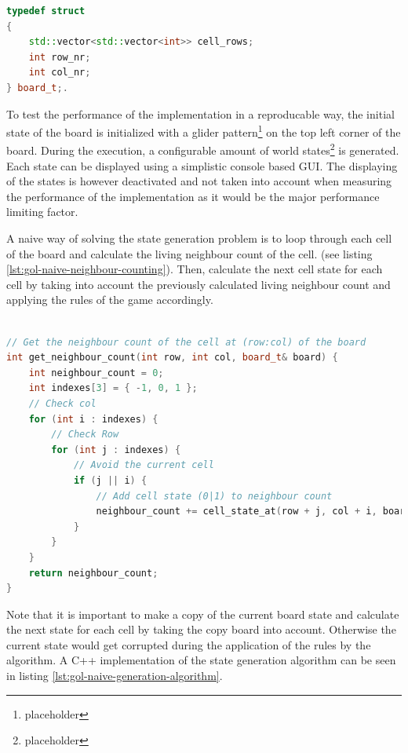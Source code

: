 \documentclass[a4paper,english,12pt,twoside=false]{scrartcl} %
\begin{document}
\begin{lstlisting}[caption={Game of Life Board Datastructure},label={lst:gol-naive-board-datastructure},language=C++]
typedef struct
{
    std::vector<std::vector<int>> cell_rows;
    int row_nr;
    int col_nr;
} board_t;.
\end{lstlisting}

To test the performance of the implementation in a reproducable way, the initial state of the board is initialized with a glider pattern\footnote{placeholder} on the top left corner of the board. During the execution, a configurable amount of world states\footnote{placeholder} is generated. Each state can be displayed using a simplistic console based GUI. The displaying of the states is however deactivated and not taken into account when measuring the performance of the implementation as it would be the major performance limiting factor. \newline

A naive way of solving the state generation problem is to loop through each cell of the board and calculate the living neighbour count of the cell. (see listing \ref{lst:gol-naive-neighbour-counting}). Then, calculate the next cell state for each cell by taking into account the previously calculated living neighbour count and applying the rules of the game accordingly. 

\begin{lstlisting}[caption={Naive Neighbour Counting},label={lst:gol-naive-neighbour-counting},language=C++]

// Get the neighbour count of the cell at (row:col) of the board
int get_neighbour_count(int row, int col, board_t& board) {
    int neighbour_count = 0;
    int indexes[3] = { -1, 0, 1 };
    // Check col
    for (int i : indexes) {
        // Check Row
        for (int j : indexes) {
            // Avoid the current cell
            if (j || i) {
                // Add cell state (0|1) to neighbour count
                neighbour_count += cell_state_at(row + j, col + i, board);
            }
        }
    }
    return neighbour_count;
}

\end{lstlisting}

Note that it is important to make a copy of the current board state and calculate the next state for each cell by taking the copy board into account. Otherwise the current state would get corrupted during the application of the rules by the algorithm. A C++ implementation of the state generation algorithm can be seen in listing \ref{lst:gol-naive-generation-algorithm}.
\end{document}
